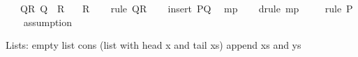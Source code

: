 \begin{isabellebody}
\ \ \ QR{\isacharcolon}{\kern0pt}\ {\isachardoublequoteopen}Q\ {\isasymLongrightarrow}\ R{\isachardoublequoteclose}\isanewline
\ \ \ {\isachardoublequoteopen}R{\isachardoublequoteclose}\isanewline
%
\isadelimproof
\isanewline
\ \ %
\endisadelimproof
%
\isatagproof
{}\isamarkupfalse%
\ {\isacharparenleft}{\kern0pt}rule\ QR{\isacharparenright}{\kern0pt}\isanewline
\ \ \isamarkupfalse%
\ {\isacharparenleft}{\kern0pt}insert\ PQ{\isacharparenright}{\kern0pt}\ \isamarkupfalse%
\ mp\isanewline
\ \ \isamarkupfalse%
\ {\isacharparenleft}{\kern0pt}drule\ mp{\isacharparenright}{\kern0pt}\isanewline
\ \ \ \isamarkupfalse%
\ {\isacharparenleft}{\kern0pt}rule\ P{\isacharparenright}{\kern0pt}\isanewline
\ \ \isamarkupfalse%
\ assumption\isanewline
\ \ \isamarkupfalse%
%
\endisatagproof
{\isafoldproof}%
%
\isadelimproof
%
\endisadelimproof
%
\isadelimdocument
%
\endisadelimdocument
%
\isatagdocument
%
\isamarkuptrue%
%
\endisatagdocument
{\isafolddocument}%
%
\isadelimdocument
%
\endisadelimdocument
%
\begin{isamarkuptext}%
Lists:
  \isa{{\isacharbrackleft}{\kern0pt}{\isacharbrackright}{\kern0pt}}       empty list
       cons (list with head x and tail xs)
    append xs and ys


\end{isamarkuptext}
\end{isabellebody}
